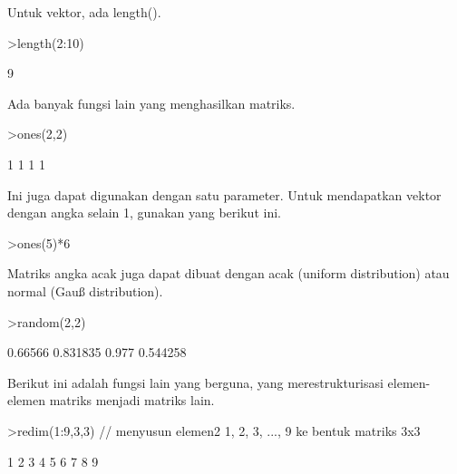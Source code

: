 \documentclass[a4paper,10pt]{article}
\begin{document}
\begin{eulernotebook}
\begin{eulercomment}
\begin{eulercomment}
\begin{eulercomment}
\begin{eulercomment}
\begin{eulercomment}
\begin{eulercomment}
\begin{eulercomment}
Untuk vektor, ada length().
\end{eulercomment}
\begin{eulerprompt}
>length(2:10)
\end{eulerprompt}
\begin{euleroutput}
  9
\end{euleroutput}
\begin{eulercomment}
Ada banyak fungsi lain yang menghasilkan matriks.
\end{eulercomment}
\begin{eulerprompt}
>ones(2,2)
\end{eulerprompt}
\begin{euleroutput}
              1             1 
              1             1 
\end{euleroutput}
\begin{eulercomment}
Ini juga dapat digunakan dengan satu parameter. Untuk mendapatkan
vektor dengan angka selain 1, gunakan yang berikut ini.
\end{eulercomment}
\begin{eulerprompt}
>ones(5)*6
\end{eulerprompt}
\begin{euleroutput}
  [6,  6,  6,  6,  6]
\end{euleroutput}
\begin{eulercomment}
Matriks angka acak juga dapat dibuat dengan acak (uniform
distribution) atau normal (Gauß distribution).
\end{eulercomment}
\begin{eulerprompt}
>random(2,2)
\end{eulerprompt}
\begin{euleroutput}
        0.66566      0.831835 
          0.977      0.544258 
\end{euleroutput}
\begin{eulercomment}
Berikut ini adalah fungsi lain yang berguna, yang merestrukturisasi
elemen-elemen matriks menjadi matriks lain.
\end{eulercomment}
\begin{eulerprompt}
>redim(1:9,3,3) // menyusun elemen2 1, 2, 3, ..., 9 ke bentuk matriks 3x3
\end{eulerprompt}
\begin{euleroutput}
              1             2             3 
              4             5             6 
              7             8             9 
\end{euleroutput}
\begin{eulercomment}

\end{eulercomment}
\end{eulercomment}
\end{eulercomment}
\end{eulercomment}
\end{eulercomment}
\end{eulercomment}
\end{eulercomment}
\end{eulernotebook}
\end{document}
